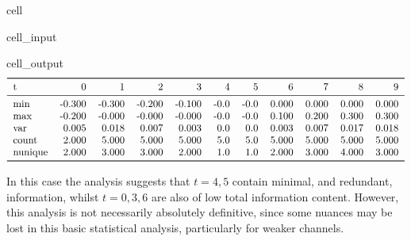 \documentclass[letterpaper,table,10pt,english]{jupyterBook}
\begin{document}
\begin{sphinxuseclass}{cell}\begin{sphinxVerbatimInput}

\begin{sphinxuseclass}{cell_input}
\begin{sphinxVerbatim}[commandchars=\\\{\}]
\PYG{p}{[}\PYG{p}{]}
\end{sphinxVerbatim}

\end{sphinxuseclass}\end{sphinxVerbatimInput}
\begin{sphinxVerbatimOutput}

\begin{sphinxuseclass}{cell_output}\begin{equation*}
\begin{split}\begin{tabular}{lrrrrrrrrrr}
\toprule
t &      0 &      1 &      2 &      3 &    4 &    5 &      6 &      7 &      8 &      9 \\
\midrule
min     & -0.300 & -0.300 & -0.200 & -0.100 & -0.0 & -0.0 &  0.000 &  0.000 &  0.000 &  0.000 \\
max     & -0.200 & -0.000 & -0.000 & -0.000 & -0.0 & -0.0 &  0.100 &  0.200 &  0.300 &  0.300 \\
var     &  0.005 &  0.018 &  0.007 &  0.003 &  0.0 &  0.0 &  0.003 &  0.007 &  0.017 &  0.018 \\
count   &  2.000 &  5.000 &  5.000 &  5.000 &  5.0 &  5.0 &  5.000 &  5.000 &  5.000 &  5.000 \\
nunique &  2.000 &  3.000 &  3.000 &  2.000 &  1.0 &  1.0 &  2.000 &  3.000 &  4.000 &  3.000 \\
\bottomrule
\end{tabular}\end{split}
\end{equation*}
\end{sphinxuseclass}\end{sphinxVerbatimOutput}

\end{sphinxuseclass}
\sphinxAtStartPar
In this case the analysis suggests that \(t=4,5\) contain minimal, and redundant, information, whilst \(t=0,3,6\) are also of low total information content. However, this analysis is not necessarily absolutely definitive, since some nuances may be lost in this basic statistical analysis, particularly for weaker channels.
\end{document}
